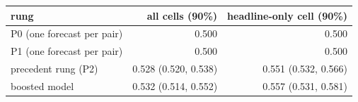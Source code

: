 \begin{tabular}{lrr}
\toprule
rung & all cells (90\%) & headline-only cell (90\%) \\
\midrule
P0 (one forecast per pair) & 0.500 & 0.500 \\
P1 (one forecast per pair) & 0.500 & 0.500 \\
precedent rung (P2) & 0.528 (0.520, 0.538) & 0.551 (0.532, 0.566) \\
boosted model & 0.532 (0.514, 0.552) & 0.557 (0.531, 0.581) \\

\end{tabular}
